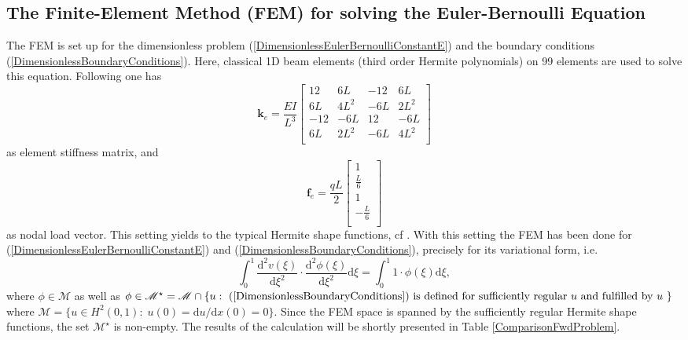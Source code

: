 \documentclass[a4paper,11pt]{article}
\begin{document}
\subsection*{The Finite-Element Method (FEM) for solving the Euler-Bernoulli Equation}
The FEM is set up for the dimensionless problem (\ref{DimensionlessEulerBernoulliConstantE}) and the boundary conditions (\ref{DimensionlessBoundaryConditions}). Here, classical 1D beam elements (third order Hermite polynomials) on 99 elements are used to solve this equation. 
Following \cite[pp. 62--69]{schwarz1991methode} one has
%
\[
\mathbf{k}_e = \frac{EI}{L^3}
\begin{bmatrix}
12 & 6L & -12 & 6L \\
6L & 4L^2 & -6L & 2L^2 \\
-12 & -6L & 12 & -6L \\
6L & 2L^2 & -6L & 4L^2 \\
\end{bmatrix}
\]
as element stiffness matrix, and
\begin{equation*}
\mathbf{f}_e = \frac{q L}{2}
\begin{bmatrix}
1 \\
\frac{L}{6} \\
1 \\
-\frac{L}{6} \\
\end{bmatrix}
\end{equation*}
%
as nodal load vector. This setting yields to the typical Hermite shape functions, cf \cite[p. 69]{schwarz1991methode}.
With this setting the FEM has been done for (\ref{DimensionlessEulerBernoulliConstantE}) and (\ref{DimensionlessBoundaryConditions}), precisely for its variational form, i.e.
\begin{equation*}
\int_0^1 \frac{\mathrm{d}^2 v(\xi)}{\mathrm{d}\xi^2} \cdot \frac{\mathrm{d}^2 \phi (\xi)}{\mathrm{d}\xi^2} \mathrm{d}\xi = \int_0^1 1 \cdot \phi (\xi) \mathrm{d}\xi ,
\end{equation*}
where $ \phi \in \mathscr{M} $ as well as  $ \phi \in \mathscr{M}^\star = \mathscr{M} \cap \{ u : \text{  (\ref{DimensionlessBoundaryConditions})  is defined for sufficiently regular $u$ and fulfilled by $u$  }\} $ where $ \mathscr{M} = \{ u \in H^2(0,1) :\; u(0) = \mathrm{d}u / \mathrm{d}x (0) = 0 \} $. Since the FEM space is spanned by the sufficiently regular Hermite shape functions, the set $ \mathscr{M}^\star $ is non-empty. The results of the calculation will be shortly presented in Table \ref{ComparisonFwdProblem}.
\end{document}
